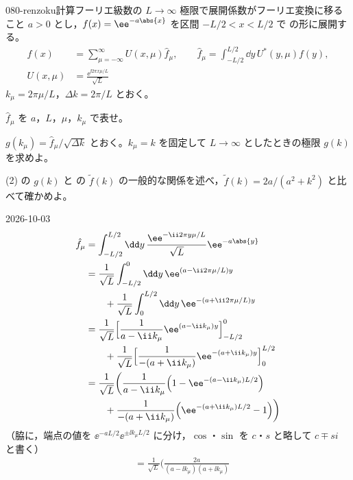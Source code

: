 \documentclass[uplatex,dvipdfmx,a4paper,11pt]{jsarticle}
\begin{document}
\mondaihen
{}
\begin{mondai}{080-renzoku}{計算}{フーリエ級数の $L\to\infty$ 極限で展開係数がフーリエ変換に移ること}
$a>0$ とし，$f(x)=\ee^{-a\abs{x}}$ を区間 $-L/2<x<L/2$ で の形に展開する。
  \begin{align*}
    f(x)&=\sum_{\mu=-\infty}^{\infty}U(x,\mu)\hat{f}_{\mu},\qquad
    \hat{f}_{\mu}=\int_{-L/2}^{L/2}\dd y\,U^{*}(y,\mu)f(y),\\
    U(x,\mu)&=\frac{\ee^{\ii2\pi x\mu/L}}{\sqrt{L}}
  \end{align*}
  $k_\mu=2\pi\mu/L$，$\Delta k=2\pi/L$ とおく。
  \begin{shoumon}
    \item $\hat f_\mu$ を $a$，$L$，$\mu$，$k_\mu$ で表せ。
    \item $g(k_\mu)=\hat f_\mu/\sqrt{\Delta k}$ とおく。$k_\mu=k$ を固定して $L\to\infty$ としたときの極限 $g(k)$ を求めよ。
    \item (2) の $g(k)$ と  の $\tilde f(k)$ の一般的な関係を述べ，$\tilde f(k)=2a/(a^{2}+k^{2})$ と比べて確かめよ。
  \end{shoumon}
\begin{kotaeutsushi}{2026-10-03}
\begin{align*}
  \hat f_\mu&=\int_{-L/2}^{L/2}\dd y\,\frac{\ee^{-\ii2\pi y\mu/L}}{\sqrt L}\ee^{-a\abs{y}}\\
  &=\frac{1}{\sqrt L}\int_{-L/2}^{0}\dd y\,\ee^{(a-\ii2\pi\mu/L)y}\\
  &\qquad+\frac{1}{\sqrt L}\int_{0}^{L/2}\dd y\,\ee^{-(a+\ii2\pi\mu/L)y}\\
  &=\frac{1}{\sqrt L}\Bigl[\frac{1}{a-\ii k_\mu}\ee^{(a-\ii k_\mu)y}\Bigr]_{-L/2}^{0}\\
  &\qquad+\frac{1}{\sqrt L}\Bigl[\frac{1}{-(a+\ii k_\mu)}\ee^{-(a+\ii k_\mu)y}\Bigr]_{0}^{L/2}\\
  &=\frac{1}{\sqrt L}\biggl(\frac{1}{a-\ii k_\mu}\Bigl(1-\ee^{-(a-\ii k_\mu)L/2}\Bigr)\\
  &\qquad+\frac{1}{-(a+\ii k_\mu)}\Bigl(\ee^{-(a+\ii k_\mu)L/2}-1\Bigr)\biggr)
\end{align*}
（脇に，端点の値を $\ee^{-aL/2}\ee^{\pm\ii k_\mu L/2}$ に分け，$\cos$・$\sin$ を $c$・$s$ と略して $c\mp si$ と書く）
\begin{align*}
  &=\frac{1}{\sqrt L}\biggl(\frac{2a}{(a-\ii k_\mu)(a+\ii k_\mu)}\\

\end{align*}
\end{kotaeutsushi}
\end{mondai}
\end{document}

